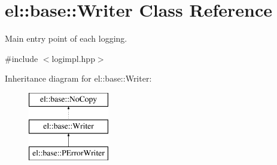 \hypertarget{classel_1_1base_1_1Writer}{\section{el\-:\-:base\-:\-:Writer Class Reference}
\label{classel_1_1base_1_1Writer}
}


Main entry point of each logging.  




{\ttfamily \#include $<$logimpl.\-hpp$>$}

Inheritance diagram for el\-:\-:base\-:\-:Writer\-:\begin{figure}[H]
\begin{center}
\leavevmode
\includegraphics[height=3.000000cm]{classel_1_1base_1_1Writer}
\end{center}
\end{figure}
